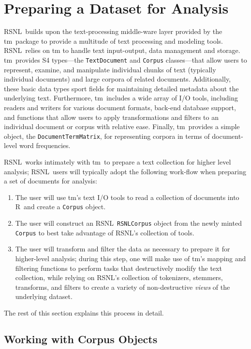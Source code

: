 \documentclass[11pt]{article}
\def\R{\textsf{R}}
\def\RSNL{{\normalfont\fontseries{b}\selectfont RSNL}}
\def\tm{{\normalfont\fontseries{b}\selectfont tm}}
\let\rclass=\texttt
\begin{document}
\section{Preparing a Dataset for Analysis}
\label{sec:prep}

\RSNL\ builds upon the text-processing middle-ware layer provided by
the \tm\ package to provide a multitude of text processing and
modeling tools.  \RSNL\ relies on \tm\cite{tm} to handle text
input-output, data management and storage.  \tm~provides S4
types---the \rclass{TextDocument} and \rclass{Corpus} classes---that
allow users to represent, examine, and manipulate individual chunks of
text (typically individual documents) and large corpora of related
documents.  Additionally, these basic data types sport fields for
maintaining detailed metadata about the underlying text.  Furthermore,
\tm~includes a wide array of I/O tools, including readers and writers
for various document formats, back-end database support, and functions
that allow users to apply transformations and filters to an individual
document or corpus with relative ease.  Finally, \tm~provides a simple
object, the \rclass{DocumentTermMatrix}, for representing corpora in terms
of document-level word frequencies.

\RSNL\ works intimately with \tm\ to prepare a text collection for
higher level analysis; \RSNL\ users will typically adopt the following
work-flow when preparing a set of documents for analysis:
\begin{enumerate} \item The user will use \tm's text I/O tools to read
a collection of documents into \R\ and create a \rclass{Corpus}
object.  \item The user will construct an \RSNL\
\rclass{RSNLCorpus} object from the newly minted \rclass{Corpus} to best
take advantage of \RSNL's collection of tools.  \item The user will
transform and filter the data as necessary to prepare it for
higher-level analysis; during this step, one will make use of \tm's
mapping and filtering functions to perform tasks that destructively
modify the text collection, while relying on \RSNL's collection of
tokenizers, stemmers, transforms, and filters to create a variety of
non-destructive \emph{views} of the underlying dataset.
\end{enumerate} The rest of this section explains this process in
detail.

\subsection{Working with Corpus Objects}
\end{document}
